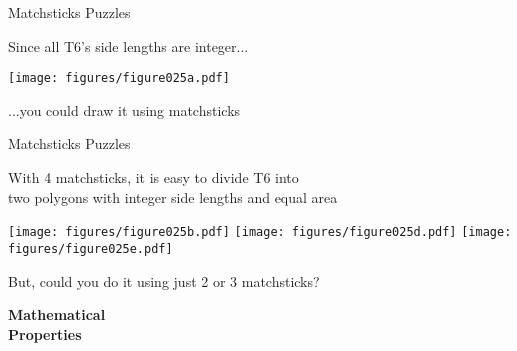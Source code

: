 \documentclass[14pt]{beamer}
\begin{document}

    \begin{frame}{Matchsticks Puzzles}
        \begin{center}
            Since all T6's side lengths are integer...

            \bigskip

            \texttt{[image: figures/figure025a.pdf]}

            \bigskip

            {...you could draw it using matchsticks}

            \bigskip\bigskip
        \end{center}
    \end{frame}


    \begin{frame}{Matchsticks Puzzles}
        \begin{center}
            {With 4 matchsticks, it is easy to divide T6 into\\[1ex]two polygons with integer side lengths and equal area}

            \bigskip\bigskip

            \texttt{[image: figures/figure025b.pdf]}\quad
            \texttt{[image: figures/figure025d.pdf]}\quad
            \texttt{[image: figures/figure025e.pdf]}\\

            \bigskip\bigskip

            {But, could you do it using just 2 or 3 matchsticks?}

            \bigskip\bigskip
        \end{center}
    \end{frame}


    \begin{frame}{}
        \begin{center}
            \textbf{\Huge Mathematical\\\bigskip Properties}\\
        \end{center}
    \end{frame}
\end{document}
